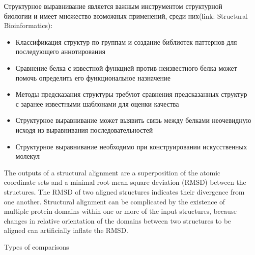 \documentclass[a4paper, 12pt, titlepage, utf8]{extarticle}
\begin{document}
Структурное выравнивание является важным инструментом структурной биологии и имеет множество возможных применений, среди них(link: Structural Bioinformatics):
\begin{itemize}
    \item Классификация структур по группам и создание библиотек паттернов для последующего аннотирования
    \item Сравнение белка с известной функцией против неизвестного белка может помочь определить его функциональное назначение 
    \item Методы предсказания структуры требуют сравнения предсказанных структур с заранее известными шаблонами для оценки качества
    \item Структурное выравнивание может выявить связь между белками неочевидную исходя из выравнивания последовательностей 
    \item Структурное выравнивание необходимо при конструировании искусственных молекул
\end{itemize}

The outputs of a structural alignment are a superposition of the atomic coordinate sets and a minimal root mean square deviation (RMSD) between the structures. The RMSD of two aligned structures indicates their divergence from one another. Structural alignment can be complicated by the existence of multiple protein domains within one or more of the input structures, because changes in relative orientation of the domains between two structures to be aligned can artificially inflate the RMSD.

Types of comparisons
\end{document}
